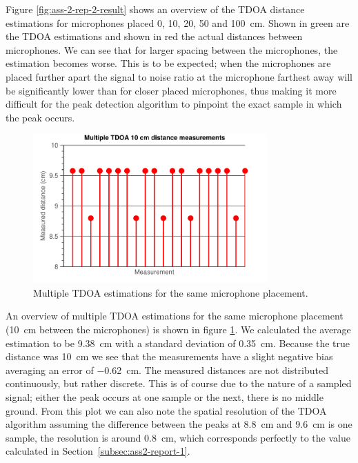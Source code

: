 \documentclass[11pt,titlepage]{report}
\begin{document}
Figure \ref{fig:ass-2-rep-2-result} shows an overview of the TDOA distance estimations for microphones placed \num{0}, \num{10}, \num{20}, \num{50} and \SI{100}{\centi\meter}. Shown in green are the TDOA estimations and shown in red the actual distances between microphones. We can see that for larger spacing between the microphones, the estimation becomes worse. This is to be expected; when the microphones are placed further apart the signal to noise ratio at the microphone farthest away will be significantly lower than for closer placed microphones, thus making it more difficult for the peak detection algorithm to pinpoint the exact sample in which the peak occurs.

\begin{figure}[H]
	\centering
	\includegraphics[width=0.8\textwidth]{../../deliverable-7-resources/figures/ass-2/report-2-3/ass-2-report-3.pdf}
	\caption{Multiple TDOA estimations for the same microphone placement.}
	\label{fig:ass-2-rep-3}
\end{figure}

An overview of multiple TDOA estimations for the same microphone placement (\SI{10}{\centi\meter} between the microphones) is shown in figure \ref{fig:ass-2-rep-3}. We calculated the average estimation to be \SI{9.38}{\centi\meter} with a standard deviation of \SI{0.35}{\centi\meter}. Because the true distance was \SI{10}{\centi\meter} we see that the measurements have a slight negative bias averaging an error of \SI{-0.62}{\centi\meter}. The measured distances are not distributed continuously, but rather discrete. This is of course due to the nature of a sampled signal; either the peak occurs at one sample or the next, there is no middle ground. From this plot we can also note the spatial resolution of the TDOA algorithm assuming the difference between the peaks at \SI{8.8}{\centi\meter} and \SI{9.6}{\centi\meter} is one  sample, the resolution is around \SI{0.8}{\centi\meter}, which corresponds perfectly to the value calculated in Section~\ref{subsec:ass2-report-1}.
\end{document}
